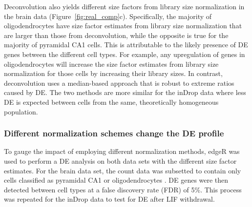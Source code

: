 \documentclass{bmcart}
\begin{document}
Deconvolution also yields different size factors from library size normalization in the brain data (Figure~\ref{fig:real_comp}c).
Specifically, the majority of oligodendrocytes have size factor estimates from library size normalization that are larger than those from deconvolution,
    while the opposite is true for the majority of pyramidal CA1 cells.
This is attributable to the likely presence of DE genes between the different cell types.
For example, any upregulation of genes in oligodendrocytes will increase the size factor estimates from library size normalization for those cells by increasing their library sizes.
In contrast, deconvolution uses a median-based approach that is robust to extreme ratios caused by DE.
The two methods are more similar for the inDrop data where less DE is expected between cells from the same, theoretically homogeneous population.


\subsubsection*{Different normalization schemes change the DE profile}
To gauge the impact of employing different normalization methods, edgeR was used to perform a DE analysis on both data sets with the different size factor estimates. 
For the brain data set, the count data was subsetted to contain only cells classified as pyramidal CA1 or oligodendrocytes \cite{zeisel2015brain}.
DE genes were then detected between cell types at a false discovery rate (FDR) of 5\%.
This process was repeated for the inDrop data to test for DE after LIF withdrawal.
\end{document}
